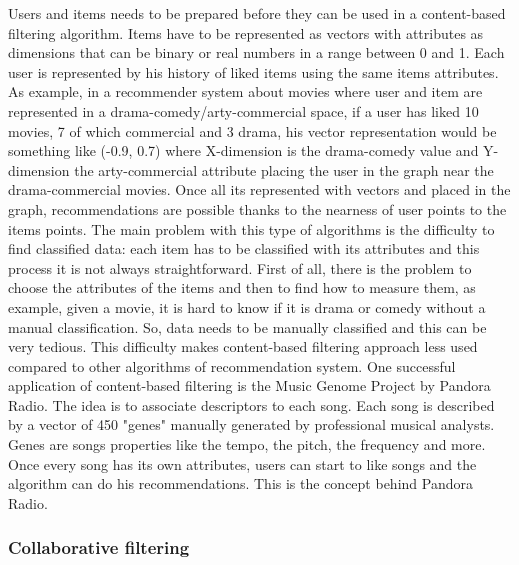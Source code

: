 \documentclass[b5paper,10pt,twoside,cucitura]{toptesi}
\begin{document}
Users and items needs to be prepared before they can be used in a content-based filtering algorithm. Items have to be represented as vectors with attributes as dimensions that can be binary or real numbers in a range between 0 and 1. Each user is represented by his history of liked items using the same items attributes. As example, in a recommender system about movies where user and item are represented in a drama-comedy/arty-commercial space, if a user has liked 10 movies, 7 of which commercial and 3 drama, his vector representation would be something like (-0.9, 0.7) where X-dimension is the drama-comedy value and Y-dimension the arty-commercial attribute placing the user in the graph near the drama-commercial movies. Once all its represented with vectors and placed in the graph, recommendations are possible thanks to the nearness of user points to the items points. The main problem with this type of algorithms is the difficulty to find classified data: each item has to be classified with its attributes and this process it is not always straightforward. First of all, there is the problem to choose the attributes of the items and then to find how to measure them, as example, given a movie, it is hard to know if it is drama or comedy without a manual classification. So, data needs to be manually classified and this can be very tedious. This difficulty makes content-based filtering approach less used compared to other algorithms of recommendation system.
One successful application of content-based filtering is the Music Genome Project by Pandora Radio. The idea is to associate descriptors to each song. Each song is described by a vector of 450 "genes" manually generated by professional musical analysts. Genes are songs properties like the tempo, the pitch, the frequency and more. Once every song has its own attributes, users can start to like songs and the algorithm can do his recommendations. This is the concept behind Pandora Radio.

\subsubsection{Collaborative filtering}
\end{document}
